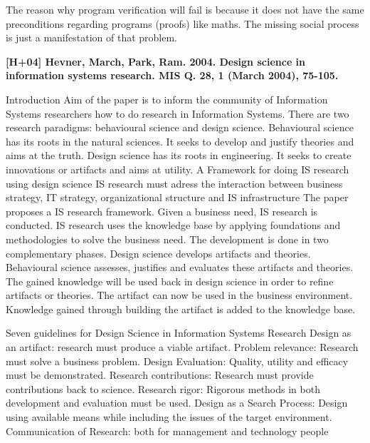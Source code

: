 \documentclass[a4paper,12pt,english]{scrartcl}
\begin{document}
The reason why program verification will fail is because it does not have the
same preconditions regarding programs (proofs) like maths. The missing social
process is just a manifestation of that problem.

\vspace{8mm}

\noindent
\textbf{\textsf{{\large [H+04] Hevner, March, Park, Ram. 2004. Design science in information systems research. MIS Q. 28, 1 (March 2004), 75-105.}}}
\vspace{2mm}

Introduction
	Aim of the paper is to inform the community of Information Systems researchers how to do research in Information Systems.
	There are two research paradigms: behavioural science and design science.
	Behavioural science has its roots in the natural sciences. It seeks to develop and justify theories and aims at the truth.
	Design science has its roots in engineering. It seeks to create innovations or artifacts and aims at utility.
A Framework for doing IS research using design science
	IS research must adress the interaction between business strategy, IT strategy, organizational structure and IS infrastructure
	The paper proposes a IS research framework.
	Given a business need, IS research is conducted.
	IS research uses the knowledge base by applying foundations and methodologies to solve the business need.
	The development is done in two complementary phases.
		Design science develops artifacts and theories.
		Behavioural science assesses, justifies and evaluates these artifacts and theories.
	The gained knowledge will be used back in design science in order to refine artifacts or theories.
	The artifact can now be used in the business environment.
	Knowledge gained through building the artifact is added to the knowledge base.

Seven guidelines for Design Science in Information Systems Research
	Design as an artifact: research must produce a viable artifact.
	Problem relevance: Research must solve a business problem.
	Design Evaluation: Quality, utility and efficacy must be demonstrated.
	Research contributions: Research must provide contributions back to science.
	Research rigor: Rigorous methods in both development and evaluation must be used.
	Design as a Search Process: Design using available means while including the issues of the target environment.
	Communication of Research: both for management and technology people
\end{document}
